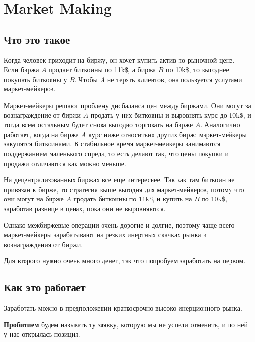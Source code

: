 \section{Market Making}
\subsection{Что это такое}

Когда человек приходит на биржу, он хочет купить актив по рыночной цене.
Если биржа $A$ продает биткоины по 11k\$, а биржа $B$ по 10k\$, то выгоднее покупать биткоины у $B$. Чтобы $A$ не терять клиентов, она пользуется услугами маркет-мейкеров.

Маркет-мейкеры решают проблему дисбаланса цен между биржами. Они могут за вознаграждение от биржи $A$ продать у них биткоины  и выровнять курс до 10k\$, и тогда всем остальным будет снова выгодно торговать на бирже $A$. Аналогично работает, когда на бирже $A$ курс ниже относитьно других бирж: маркет-мейкеры закупятся биткоинами. В стабильное время маркет-мейкеры занимаются поддержанием маленького спреда, то есть делают так, что цены покупки и продажи отличаются как можно меньше.


На децентрализованных биржах все еще интереснее.
Так как там биткоин не привязан к бирже, то стратегия выше выгодня для маркет-мейкеров, потому что они могут на бирже $A$ продать биткоины по 11k\$, и купить на $B$ по 10k\$, заработав разнице в ценах, пока они не выровняются. 

Однако межбиржевые операции очень дорогие и долгие, поэтому чаще всего маркет-мейкеры зарабатывают на резких инертных скачках рынка и вознаграждения от биржи.

Для второго нужно очень много денег, так что попробуем заработать на первом.

\subsection{Как это работает}
Заработать можно в предположении краткосрочно высоко-инерционного рынка.

 \textbf{Пробитием} будем называть ту заявку, которую мы не успели отменить, и по ней у нас открылась позиция.

